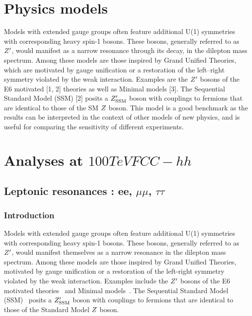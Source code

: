 \documentclass{cernrep}
\begin{document}
\section{Physics models}
\label{sec:physmodel}

Models with extended gauge groups often feature additional U(1) symmetries with corresponding heavy spin-1 bosons. These bosons, generally referred to as $Z^{\prime}$, would manifest as a narrow resonance through
its  decay,  in  the  dilepton  mass  spectrum.   
Among  these  models  are  those  inspired  by  Grand  Unified Theories, which are 
motivated by gauge unification or a restoration of the left–right symmetry violated
by the weak interaction. Examples are the $Z^{\prime}$
bosons of the E6 motivated [1, 2] theories as well as Minimal models [3].  
The Sequential Standard Model (SSM) [2] posits a $Z^{\prime}_{\mathrm{SSM}}$ boson with couplings to fermions
that are identical to those of the SM $Z$ boson. This model is a good benchmark as the 
results can be interpreted in the context of other models of new physics, and is useful 
for comparing the sensitivity of different experiments.



\section{Analyses at $100 TeV FCC-hh$}
\label{sec:ana100tev}

\subsection{Leptonic resonances : ee, $\mu\mu$, $\tau\tau$}
\label{subsec:lepreso}

\subsubsection{Introduction}
Models with extended gauge groups often feature additional U(1) symmetries with corresponding heavy spin-1 bosons. These bosons, generally referred to as $Z^{\prime}$, would manifest themselves as a narrow resonance in the dilepton mass spectrum. Among these models are those inspired by Grand Unified Theories, motivated by gauge unification or a restoration of the left-right symmetry violated by the weak interaction. Examples include the $Z^{\prime}$ bosons of the E6 motivated theories~\cite{London:1986jz,Joglekar:2016yap,Langacker:2008yv} and Minimal models~\cite{Salvioni:2009mt}. The Sequential Standard Model (SSM)~\cite{Langacker:2008yv} posits a $Z^{\prime}_{\mathrm{SSM}}$ boson with couplings to fermions that are identical to those of the Standard Model $Z$ boson.
\end{document}
